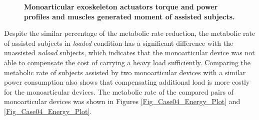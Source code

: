 \documentclass[10pt,letterpaper]{article}
\begin{document}
\begin{figure}[ht!]
	\centering
	\hfil
	\vspace{1mm}
	\caption{\small{\textbf{Monoarticular exoskeleton actuators torque and power profiles and muscles generated moment of assisted subjects.} }}
	\label{Fig_Case04_Profiles}
\end{figure}
Despite the similar percentage of the metabolic rate reduction, the metabolic rate of assisted subjects in {\it loaded} condition has a significant difference with the unassisted {\it noload} subjects, which indicates that the monoarticular device was not able to compensate the cost of carrying a heavy load sufficiently. Comparing the metabolic rate of subjects assisted by two monoarticular devices with a similar power consumption also shows that compensating additional load is more costly for the monoarticular devices. The metabolic rate of the compared pairs of monoarticular devices was shown in Figures \ref{Fig_Case04_Energy_Plot} and \ref{Fig_Case04_Energy_Plot}. 
\end{document}
